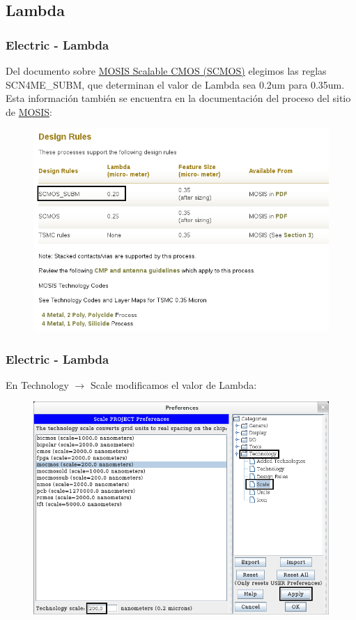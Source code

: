\documentclass{beamer}
\begin{document}
\begin{frame}
\subsection{Lambda}
\frametitle{Electric - Lambda}

Del documento sobre \href{https://www.mosis.com/files/scmos/scmos.pdf}{MOSIS Scalable CMOS (SCMOS)} elegimos las reglas SCN4ME\_SUBM, que determinan el valor de Lambda sea 0.2um para 0.35um. Esta información también se encuentra en la documentación del proceso del sitio de \href{https://www.mosis.com/vendors/view/tsmc/035}{MOSIS}: 
\begin{figure}
\includegraphics[width=0.7\linewidth]{figuras/configuracionElectric-6.png}
\end{figure}
\end{frame}

 
\begin{frame}
\frametitle{Electric - Lambda}
En Technology  $\rightarrow$ Scale modificamos el valor de Lambda:
\begin{figure}
\includegraphics[width=0.7\linewidth]{figuras/configuracionElectric-7.png}
\end{figure}
\end{frame}
\end{document}
